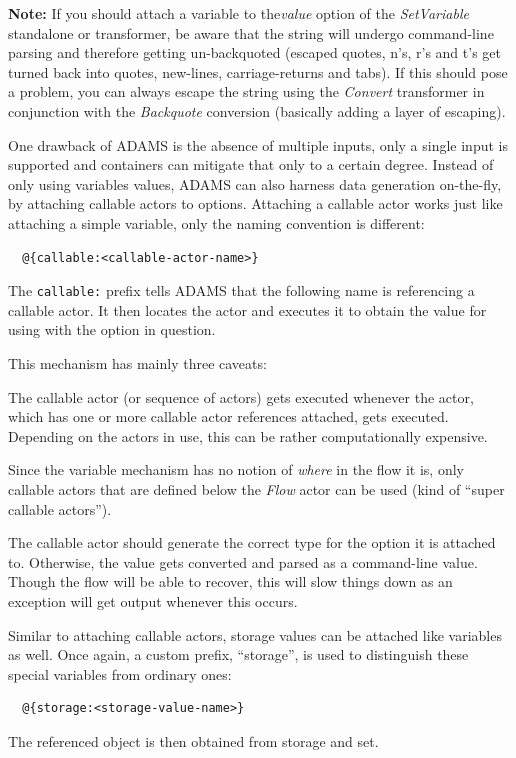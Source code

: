 \noindent \textbf{Note:} If you should attach a variable to the\textit{value}
option of the \textit{SetVariable} standalone or transformer, be aware that
the string will undergo command-line parsing and therefore getting un-backquoted
(escaped quotes, n's, r's and t's get turned back into quotes, new-lines,
carriage-returns and tabs). If this should pose a problem, you can always
escape the string using the \textit{Convert} transformer in conjunction with
the \textit{Backquote} conversion (basically adding a layer of escaping).

One drawback of ADAMS is the absence of multiple inputs, only a single input is
supported and containers can mitigate that only to a certain degree. Instead of
only using variables values, ADAMS can also harness data generation on-the-fly,
by attaching callable actors to options. Attaching a callable actor works just like
attaching a simple variable, only the naming convention is different:
\begin{verbatim}
  @{callable:<callable-actor-name>}
\end{verbatim}
The \texttt{callable:} prefix tells ADAMS that the following name is referencing a
callable actor. It then locates the actor and executes it to obtain the value for
using with the option in question.

This mechanism has mainly three caveats:
\begin{tight_itemize}
	\item The callable actor (or sequence of actors) gets executed whenever the
	actor, which has one or more callable actor references attached, gets executed.
	Depending on the actors in use, this can be rather computationally expensive.
	\item Since the variable mechanism has no notion of \textit{where} in the flow
	it is, only callable actors that are defined below the \textit{Flow} actor can be
	used (kind of ``super callable actors'').
	\item The callable actor should generate the correct type for the option it is
	attached to. Otherwise, the value gets converted and parsed as a command-line
	value. Though the flow will be able to recover, this will slow things down
	as an exception will get output whenever this occurs.
\end{tight_itemize}

Similar to attaching callable actors, storage values can be attached like
variables as well. Once again, a custom prefix, ``storage'', is used to
distinguish these special variables from ordinary ones:
\begin{verbatim}
  @{storage:<storage-value-name>}
\end{verbatim}
The referenced object is then obtained from storage and set.

